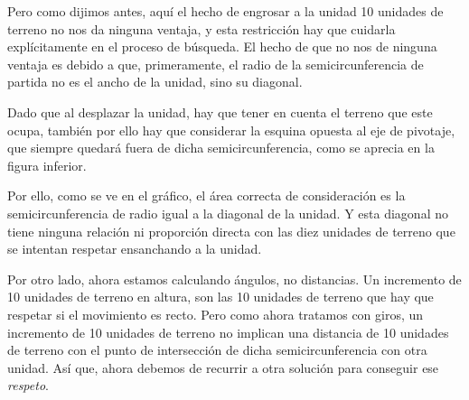 Pero como dijimos antes, aquí el hecho de engrosar a la unidad 10
unidades de terreno no nos da ninguna ventaja, y esta restricción hay
que cuidarla explícitamente en el proceso de búsqueda. El hecho de que
no nos de ninguna ventaja es debido a que, primeramente, el radio de
la semicircunferencia de partida no es el ancho de la unidad, sino su
diagonal.

Dado que al desplazar la unidad, hay que tener en cuenta el terreno
que este ocupa, también por ello hay que considerar la esquina opuesta al
eje de pivotaje, que siempre quedará fuera de dicha
semicircunferencia, como se aprecia en la figura inferior.

Por ello, como se ve en el gráfico, el área correcta de consideración es la
semicircunferencia de radio igual a la diagonal de la unidad. Y esta
diagonal no tiene ninguna relación ni proporción directa con las diez
unidades de terreno que se intentan respetar ensanchando a la unidad.

\begin{minipage}[h]{.5\columnwidth}
Por otro lado, ahora estamos calculando ángulos, no distancias. Un
incremento de 10 unidades de terreno en altura, son las 10 unidades de
terreno que hay que respetar si el movimiento es recto. Pero como
ahora tratamos con giros, un incremento de 10 unidades de terreno no
implican una distancia de 10 unidades de terreno con el punto de
intersección de dicha semicircunferencia con otra unidad. Así que,
ahora debemos de recurrir a otra solución para conseguir ese
\emph{respeto}.
\end{minipage}
\begin{minipage}[h]{.5\columnwidth}
\centering
{}
\end{minipage}

